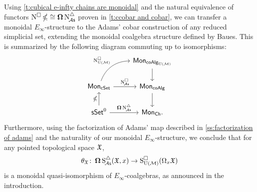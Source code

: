 Using \cref{t:cubical e-infty chains are monoidal} and the natural equivalence of functors $\operatorname{N^{\square}} \operatorname{\mathbb{\Omega}} \cong \operatorname{\mathbf{\Omega}} \operatorname{N^{\triangle}_{\!{\mathcal{A}\mathsf{s}}}}$ proven in \cref{t:ccobar and cobar}, we can transfer a monoidal $E_\infty$-structure to the Adams' cobar construction of any reduced simplicial set, extending the monoidal coalgebra structure defined by Baues.
This is summarized by the following diagram commuting up to isomorphisms:
\[
\begin{tikzcd}
	& \Mon_{\coAlg_\UM} \arrow[d] \\
	\Mon_{\cSet} \arrow[ru, "\cchainsUM", out=70, in=180] \arrow[r, "\cchainsA"]
	& \Mon_{\coAlg} \arrow[d] \\
	\sSet^0 \arrow[r, "\cobar \schainsA"] \arrow[u, "\ccobar"]
	& \Mon_{\Ch}.
\end{tikzcd}
\]
Furthermore, using the factorization of Adams' map described in \cref{ss:factorization of adams} and the naturality of our monoidal $E_\infty$-structure, we conclude that for any pointed topological space $\mathfrak{X}$,
\[
\theta_{\mathfrak{X}} \colon \operatorname{\mathbf{\Omega}} \operatorname{S^{\triangle}_{\!{\mathcal{A}\mathsf{s}}}}(\mathfrak{X},x) \to \operatorname{S^{\square}_{{\operatorname{U}(\mathcal{M})}}}(\Omega_x \mathfrak{X})
\]
is a monoidal quasi-isomorphism of $E_{\infty}$-coalgebras, as announced in the introduction.

